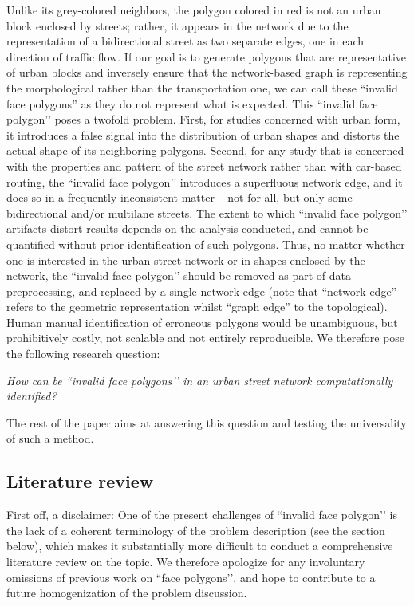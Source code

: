Unlike its grey-colored neighbors, the polygon colored in red is not an urban block
enclosed by streets; rather, it appears in the network due to the representation of a
bidirectional street as two separate edges, one in each direction of traffic flow. If
our goal is to generate  polygons that are representative of urban blocks and inversely
ensure that the network-based graph is representing the morphological rather than the
transportation one, we can call these ``invalid face polygons'' as they do not represent
what is expected. This ``invalid face polygon’’ poses a twofold problem. First, for
studies concerned with urban form, it introduces a false signal into the distribution of
urban shapes and distorts the actual shape of its neighboring polygons. Second, for any
study that is concerned with the properties and pattern of the street network rather
than with car-based routing, the ``invalid face polygon’’ introduces a superfluous
network edge, and it does so in a frequently inconsistent matter – not for all, but only
some bidirectional and/or multilane streets. The extent to which ``invalid face
polygon’’ artifacts distort results depends on the analysis conducted, and cannot be
quantified without prior identification of such polygons. Thus, no matter whether one is
interested in the urban street network or in shapes enclosed by the network, the
``invalid face polygon’’ should be removed as part of data preprocessing, and replaced
by a single network edge (note that ``network edge'' refers to the geometric
representation whilst ``graph edge'' to the topological). Human manual identification of
erroneous polygons would be unambiguous, but prohibitively costly, not scalable and not
entirely reproducible. We therefore pose the following research question:

\begin{center}
\textit{How can be ``invalid face polygons’’ in an urban street network computationally identified?}
\end{center}

The rest of the paper aims at answering this question and testing the universality of such
a method.

\subsection*{Literature review}

First off, a disclaimer: One of the present challenges of ``invalid face polygon’’ is the lack of a
coherent terminology of the problem description (see the section below), which makes it
substantially more difficult to conduct a comprehensive literature review on the topic.
We therefore apologize for any involuntary omissions of previous work on ``face polygons’’,
and hope to contribute to a future homogenization of the problem discussion.

